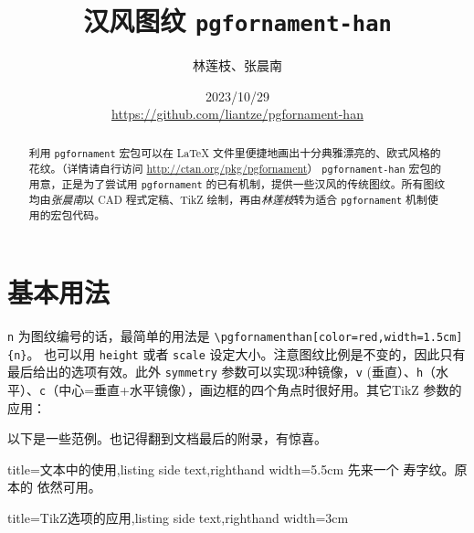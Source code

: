 \documentclass[fontset=fandol]{ctexart}
\title{汉风图纹 \texttt{pgfornament-han}}
\author{林莲枝、张晨南}
\date{2023/10/29\\\url{https://github.com/liantze/pgfornament-han}}
\newcommand{\latexinline}[1]{\lstinline|#1|}
\begin{document}
\maketitle

\begin{abstract}
利用 \texttt{pgfornament} 宏包可以在 \LaTeX{} 文件里便捷地画出十分典雅漂亮的、欧式风格的花纹。（详情请自行访问 \url{http://ctan.org/pkg/pgfornament}）
 \texttt{pgfornament-han} 宏包的用意，正是为了尝试用 \texttt{pgfornament} 的已有机制，提供一些汉风的传统图纹。所有图纹均由\emph{张晨南}以 CAD 程式定稿、TikZ 绘制，再由\emph{林莲枝}转为适合 \texttt{pgfornament} 机制使用的宏包代码。
\end{abstract}

\part{基本用法}

\texttt{n} 为图纹编号的话，最简单的用法是 \latexinline{\pgfornamenthan[color=red,width=1.5cm]{n}}。
也可以用 \texttt{height} 或者 \texttt{scale} 设定大小。注意图纹比例是不变的，因此只有最后给出的选项有效。此外 \texttt{symmetry} 参数可以实现3种镜像，\texttt{v} (垂直）、\texttt{h}（水平）、\texttt{c}（中心=垂直+水平镜像），画边框的四个角点时很好用。其它TikZ 参数的应用：

\begin{latexcode}
\end{latexcode}

以下是一些范例。也记得翻到文档最后的附录，有惊喜。

\bigskip

\begin{tcblisting}{title={文本中的使用},listing side text,righthand width=5.5cm}
先来一个 
寿字纹。原本的  依然可用。
\end{tcblisting}

\enlargethispage{\baselineskip}


\begin{tcblisting}{title={TikZ选项的应用},listing side text,righthand width=3cm}
\end{tcblisting}
\end{document}

